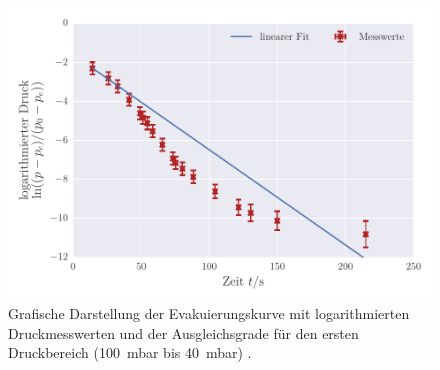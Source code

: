 \begin{figure}[!h]
 \centering
 \includegraphics[scale=.80]{../Grafiken/Evakuierungskurve_Drehschieber_log_0.pdf}
 \caption{Grafische Darstellung der Evakuierungskurve mit logarithmierten Druckmesswerten und der Ausgleichsgrade für den ersten Druckbereich (\SI{100}{\milli\bar} bis \SI{40}{\milli\bar}) .\label{fig:evakuierungskurve_drehschieber_log_0}}
 \end{figure} 